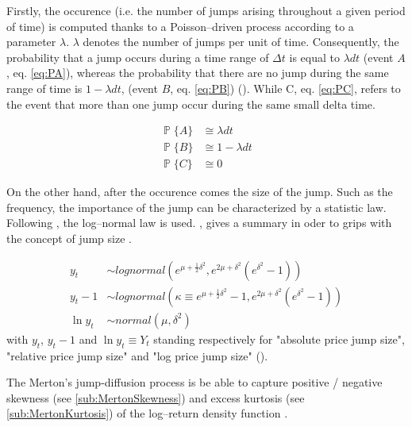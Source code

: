 \documentclass[a4paper, 12pt]{report}
\begin{document}
Firstly, the occurence (i.e. the number of jumps arising throughout a given period of time) is computed thanks to a Poisson--driven process according to a parameter $\lambda$. 
$\lambda$ denotes the number of jumps per unit of time. Consequently, the probability that a jump occurs during a time range of $\Delta t$ is equal to $\lambda dt$ (event $A$, eq. \ref{eq:PA}), whereas the probability that there are no jump during the same range of time is $1 - \lambda dt$, (event $B$, eq. \ref{eq:PB}) (\citet{matsuda2004}). While C, eq. \ref{eq:PC}, refers to the event that more than one jump occur during the same small delta time.

\begin{align}
  \mathop{\mathbb{P}} \{A\}&\cong \lambda dt  \label{eq:PA}\\
  \mathop{\mathbb{P}} \{B\}&\cong 1 - \lambda dt  \label{eq:PB}\\
  \mathop{\mathbb{P}} \{C\}&\cong   0 \label{eq:PC}
\end{align}

On the other hand, after the occurence comes the size of the jump. Such as the frequency, the importance of the jump can be characterized by a statistic law. Following \citet{heston}, the log--normal law is used. \citet{matsuda2004}, gives a summary in oder to grips with the concept of jump size  .
 
\begin{align}
  y_t  &\sim lognormal( e^{\mu + \frac{1}{2} \delta^2}, 
                        e^{2 \mu + \delta ^2} (e^{\delta^2} - 1)) 
  \label{eq:yt} \\
  y_t - 1 &\sim lognormal( \kappa \equiv e^{\mu + \frac{1}{2} \delta^2} - 1, 
                        e^{2 \mu + \delta ^2} (e^{\delta^2} - 1)) 
  \label{eq:ytminus1} \\
  \ln{y_t} &\sim normal(\mu, \delta^ 2)
  \label{eq:lny}
\end{align}
with $y_t$, $y_t - 1$ and $\ln{y_t} \equiv Y_t$ standing respectively for "absolute price jump size", "relative price jump size" and "log price jump size" (\citet{matsuda2004}).

 
The Merton's jump-diffusion process is be able to capture positive / negative skewness (see \cref{sub:MertonSkewness}) and excess kurtosis (see \cref{sub:MertonKurtosis}) of the log--return density function \citet{merton76}. 


\end{document}
